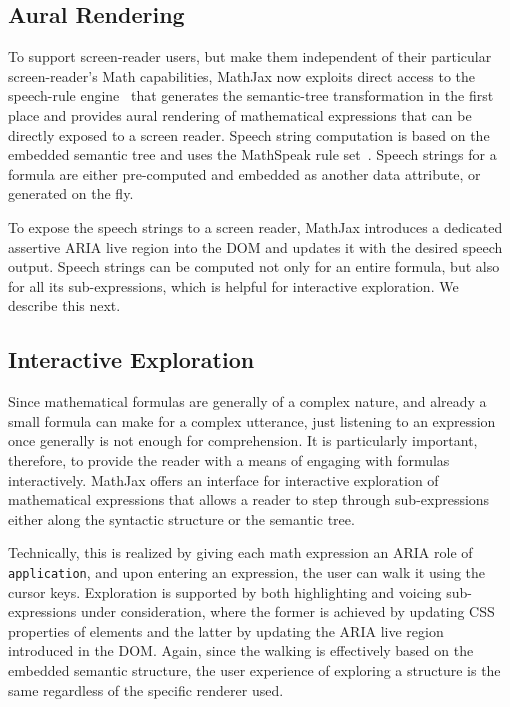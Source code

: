\documentclass{sig-alternate}
\begin{document}
\subsection{Aural Rendering}

To support screen-reader users, but make them independent of their particular
screen-reader's Math capabilities, MathJax now exploits direct access to the
speech-rule engine~\cite{Sorge14} that generates the semantic-tree
transformation in the first place and provides aural rendering of mathematical
expressions that can be directly exposed to a screen reader. Speech string
computation is based on the embedded semantic tree and uses the MathSpeak rule
set~\cite{MathSpeak}. Speech strings for a formula are either
pre-computed and embedded as another data attribute, or generated on the fly. 

To expose the speech strings to a screen reader, MathJax introduces a dedicated assertive ARIA
live region into the DOM and updates it with the desired speech output.
Speech strings can be computed not only for an entire formula, but also
for all its sub-expressions, which is helpful for interactive exploration.  We 
describe this next.




\subsection{Interactive Exploration}

Since mathematical formulas are generally of a complex nature, and already a
small formula can make for a complex utterance, just listening to an expression
once generally is not enough for comprehension. It is particularly
important, therefore, to provide the reader with a means of engaging with formulas
interactively. MathJax offers an interface for interactive exploration
of mathematical expressions that allows a reader to step through sub-expressions
either along the syntactic structure or the semantic tree.

Technically, this is realized by giving each math expression an ARIA role of
\texttt{application}, and upon entering an expression, the user can walk it using the
cursor keys. Exploration is supported by both highlighting and voicing
sub-expressions under consideration, where the former is achieved by updating
CSS properties of elements and the latter by updating the ARIA live region
introduced in the DOM.  Again, since the walking is effectively based on the
embedded semantic structure, the user experience of exploring a structure is the
same regardless of the specific renderer used.
\end{document}
